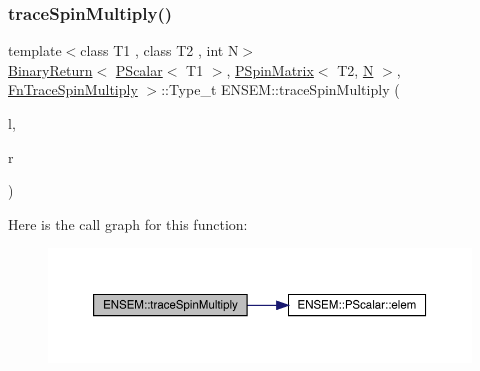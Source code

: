 \subsubsection{\texorpdfstring{traceSpinMultiply()}{traceSpinMultiply()}\hspace{0.1cm}{\footnotesize\ttfamily [3/3]}}
{\footnotesize\ttfamily template$<$class T1 , class T2 , int N$>$ \\
\mbox{\hyperlink{structENSEM_1_1BinaryReturn}{Binary\+Return}}$<$ \mbox{\hyperlink{classENSEM_1_1PScalar}{P\+Scalar}}$<$ T1 $>$, \mbox{\hyperlink{classENSEM_1_1PSpinMatrix}{P\+Spin\+Matrix}}$<$ T2, \mbox{\hyperlink{operator__name__util_8cc_a7722c8ecbb62d99aee7ce68b1752f337}{N}} $>$, \mbox{\hyperlink{structENSEM_1_1FnTraceSpinMultiply}{Fn\+Trace\+Spin\+Multiply}} $>$\+::Type\+\_\+t E\+N\+S\+E\+M\+::trace\+Spin\+Multiply (\begin{DoxyParamCaption}\item[{const \mbox{\hyperlink{classENSEM_1_1PScalar}{P\+Scalar}}$<$ T1 $>$ \&}]{l,  }\item[{const \mbox{\hyperlink{classENSEM_1_1PSpinMatrix}{P\+Spin\+Matrix}}$<$ T2, \mbox{\hyperlink{operator__name__util_8cc_a7722c8ecbb62d99aee7ce68b1752f337}{N}} $>$ \&}]{r }\end{DoxyParamCaption})\hspace{0.3cm}{\ttfamily [inline]}}

Here is the call graph for this function\+:\nopagebreak
\begin{figure}[H]
\begin{center}
\leavevmode
\includegraphics[width=350pt]{d6/df5/group__primspinmatrix_ga2dc2ab87ff63abab3c74a0a1f1dd3d09_cgraph}
\end{center}
\end{figure}

